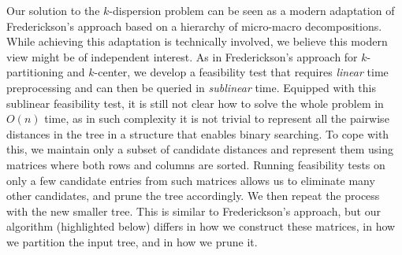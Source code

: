 \documentclass[a4paper,UKenglish]{lipics-v2016}
\theoremstyle{plain}
\begin{document}
 
\vspace{0.04in} 
Our solution to the $k$-dispersion problem can be seen as a modern adaptation of Frederickson's approach based on a hierarchy of micro-macro decompositions. While achieving this adaptation is technically involved, we believe this modern view might be of independent interest. As in Frederickson's approach for $k$-partitioning and $k$-center, we develop a feasibility test that requires {\em linear} time preprocessing and can then be queried in \emph{sublinear} time.
Equipped with this sublinear feasibility test, it is still not clear how to solve the whole problem in $O(n)$ time, as in such complexity it is not trivial to represent all the pairwise distances in the tree in a structure that enables binary searching. To cope with this, we maintain only a subset of candidate distances and represent them using matrices where both rows and columns are sorted. Running feasibility tests on only a few candidate entries from such matrices allows us to eliminate many other candidates, and prune the tree accordingly. We then repeat the process with the new smaller tree.
This is similar to Frederickson's approach, but our algorithm (highlighted below) differs in how we construct these matrices,  in how we partition the input tree, and in how we prune it. 
\end{document}
